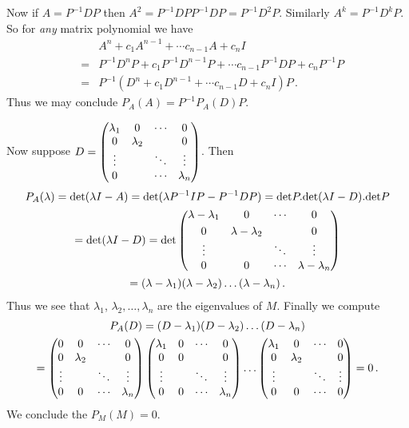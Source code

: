 \begin{enumerate}
Now if $A=P^{-1}DP$ then $A^2=P^{-1}DPP^{-1}DP=P^{-1}D^2P$. Similarly $A^k=P^{-1} D^k P$. So for {\it any} matrix polynomial we have
\begin{eqnarray}
&& A^n + c_1 A^{n-1} + \cdots c_{n-1} A + c_n I \nonumber \\ &=& P^{-1}D^nP + c_1 P^{-1}D^{n-1}P + \cdots c_{n-1} P^{-1}DP + c_n P^{-1}P \nonumber \\ &=&
P^{-1}( D^n + c_1 D^{n-1} + \cdots c_{n-1} D + c_n I)P\, .\nonumber
\end{eqnarray}
Thus we may conclude $P_A(A)=P^{-1} P_A(D) P$. 

Now suppose 
$D=\begin{pmatrix}\lambda_1 & \mc0 &\cdots & \mc0 \\ \mc0 &\lambda_2 & &\mc 0\\ \mc\vdots& & \ddots &\mc\vdots \\ \mc0 &&\cdots    &\lambda_n \end{pmatrix}$. Then 
\begin{gather*}P_A(\lambda) = {\rm det} (\lambda I - A) = {\rm det} (\lambda P^{-1} I P - P^{-1} D P) = {\rm det} P . {\rm det} (\lambda I - D). {\rm det} P\\
= {\rm det} (\lambda I - D)={\rm det}
 \begin{pmatrix}\lambda-\lambda_1 & \mc0 &\cdots & \mc0 \\[1mm] \mc0 &\lambda-\lambda_2 & &\mc 0 \\ \mc\vdots& & \ddots &\mc\vdots \\ \mc0 &\mc 0&\cdots    &\lambda-\lambda_n \end{pmatrix}\\=(\lambda-\lambda_1)(\lambda-\lambda_2)\ldots (\lambda-\lambda_n)\, .
\end{gather*}
Thus we see that $\lambda_1$, $\lambda_2, \ldots , \lambda_n$ are the eigenvalues of $M$. Finally we compute 
\begin{gather*}
P_A(D) = (D-\lambda_1)(D-\lambda_2)\ldots (D-\lambda_n)
\\
=\begin{pmatrix}\mc 0 & \mc 0 &\cdots & \mc 0 \\ \mc 0 &\lambda_2 & &\mc 0 \\ \mc\vdots& & \ddots &\mc\vdots \\ \mc 0 &\mc 0&\cdots    &\lambda_n \end{pmatrix}
\begin{pmatrix}\lambda_1 & \mc 0 &\cdots & \mc 0 \\ \mc 0 &\mc 0 & &\mc 0 \\ \mc\vdots& & \ddots &\mc\vdots \\ \mc 0 &\mc 0&\cdots    &\lambda_n \end{pmatrix}
\ldots
\begin{pmatrix}\lambda_1 & \mc 0 &\cdots & \mc 0 \\ \mc 0 &\lambda_2 & &\mc 0 \\ \mc\vdots& & \ddots & \mc\vdots\\ \mc 0 &\mc 0&\cdots    &\mc 0\end{pmatrix}
=0\, .
\end{gather*}
We conclude the $P_M(M)=0$.



\end{enumerate}
